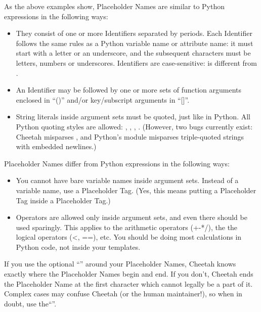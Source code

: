 As the above examples show, Placeholder Names are similar to Python
expressions in the following ways:

\begin{itemize}

\item  They consist of one or more Identifiers separated by periods.  Each
     Identifier follows the same rules as a Python variable name or attribute
     name: it must start with a letter or an underscore, and the subsequent
     characters must be letters, numbers or underscores.  Identifiers are
     case-sensitive:  is different from .

\item  An Identifier may be followed by one or more sets of function arguments
     enclosed in ``()'' and/or key/subscript arguments in ``[]''.

\item  String literals inside argument sets must be quoted, just like in
     Python.  All Python quoting styles are allowed:  ,
     , , .  (However,
     two bugs currently exist: Cheetah misparses , and Python's
      module misparses triple-quoted strings with embedded
     newlines.)

\end{itemize}

Placeholder Names differ from Python expressions in the following ways:

\begin{itemize}

\item  You cannot have bare variable names inside argument sets.  Instead of a
     variable name, use a Placeholder Tag.  (Yes, this means putting a
     Placeholder Tag inside a Placeholder Tag.)

\item  Operators are allowed only inside argument sets, and even there should
     be used sparingly.  This applies to the arithmetic operators (+-*/), the
     the logical operators (<, ==), etc.  You should be doing most calculations
     in Python code, not inside your templates.

\end{itemize}

If you use the optional ``{}'' around your Placeholder Names, Cheetah knows
exactly where the Placeholder Names begin and end.  If you don't, Cheetah ends
the Placeholder Name at the first character which cannot legally be a part of
it.  Complex cases may confuse Cheetah (or the human maintainer!), so when in
doubt, use the``{}''.

